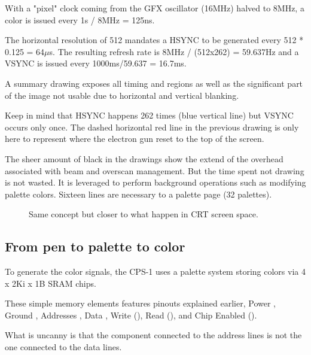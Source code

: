 With a "pixel" clock coming from the GFX oscillator (16MHz) halved to 8MHz, a color is issued every 1s / 8MHz = 125ns.

The horizontal resolution of 512 mandates a HSYNC to be generated every 512 * 0.125 = 64$\mu$s. The resulting refresh rate is 8MHz / (512x262) = 59.637Hz and a VSYNC is issued every 1000ms/59.637 = 16.7ms.


A summary drawing exposes all timing and regions as well as the significant part of the image not usable due to horizontal and vertical blanking.






Keep in mind that HSYNC happens 262 times (blue vertical line) but VSYNC occurs only once. The dashed horizontal red line in the previous drawing is only here to represent where the electron gun reset to the top of the screen.

The sheer amount of black in the drawings show the extend of the overhead associated with beam and overscan management. But the time spent not drawing is not wasted. It is leveraged to perform background operations such as modifying palette colors. Sixteen lines are necessary to a palette page (32 palettes).

\begin{figure}[H]
\caption*{Same concept but closer to what happen in CRT screen space.}
\end{figure}


\subsection{From pen to palette to color}

To generate the color signals, the CPS-1 uses a palette system storing colors via 4 x 2Ki x 1B  SRAM chips.


These simple memory elements features pinouts explained earlier, Power , Ground , Addresses , Data , Write (), Read (), and Chip Enabled ().

What is uncanny is that the component connected to the address lines is not the one connected to the data lines.

